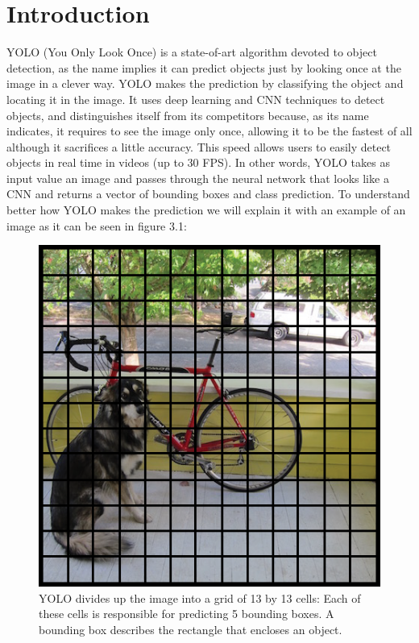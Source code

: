 \section{Introduction}
YOLO (You Only Look Once) is a state-of-art algorithm devoted to object detection, as the name implies it can predict objects just by looking once at the image in a clever way. YOLO makes the prediction by classifying the object and locating it in the image. It uses deep learning and CNN techniques to detect objects, and distinguishes itself from its competitors because, as its name indicates, it requires to see the image only once, allowing it to be the fastest of all although it sacrifices a little accuracy. This speed allows users to easily detect objects in real time in videos (up to 30 FPS). In other words, YOLO takes as input value an image and passes through the neural network that looks like a CNN and returns a vector of bounding boxes and class prediction. To understand better how YOLO makes the prediction we will explain it with an example of an image as it can be seen in figure 3.1:
\newpage

\begin{figure}[h]
    \centering
    \includegraphics[max width=\textwidth]{images/ours/yolo-grid.png}
   \caption[Initial YOLO bounding boxes]{ YOLO divides up the image into a grid of 13 by 13 cells: Each of these cells is responsible for predicting 5 bounding boxes. A bounding box describes the rectangle that encloses an object. }
    \label{fig:yolo-grid}
\end{figure}



